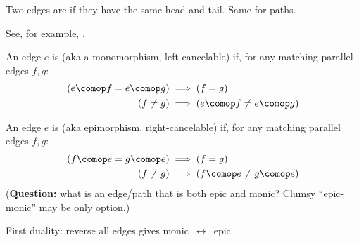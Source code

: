 \documentclass[11pt,openany]{book}
\let\oldfigure\figure%
\let\endoldfigure\endfigure%
\renewenvironment{figure}[1][htbp]%
  {\oldfigure[#1]\mdframed[backgroundcolor=GhostWhite,linecolor=GhostWhite]}
  {\endmdframed\endoldfigure}
\begin{document}
Two edges are  
if they have the same head and tail.
Same for paths.


See, for example, \cite{Perrone:2019:CatTheory}.

\begin{figure}
\centering
{}
\caption{Monic edge $e$: 
$\left( f \neq g \right) 
\implies 
\left( e \comop f \, \neq \, e \comop g \right)$.}
\label{fig:monic}
\end{figure}

An edge $e$ is  (aka a monomorphism, left-cancelable)
if, for any matching parallel edges $f,g$:
\begin{align*}
\left( e \comop f = e \comop g \right) 
& 
\implies 
\left( f = g \right) 
\\
\left( f \neq g \right) 
&
\implies 
\left( e \comop f \neq e \comop g \right) 
\end{align*}

\begin{figure}
\centering
{}
\caption{Epic edge $e$: 
$\left( f \neq g \right)
 \implies 
 \left( f \comop e \, \neq \, g \comop e \right)$.}
\label{fig:epic}
\end{figure}

An edge $e$ is  (aka epimorphism, right-cancelable)
if, for any matching parallel edges $f,g$:
\begin{align*}
\left( f \comop e = g \comop e \right) 
& 
\implies 
\left( f = g \right)
\\
\left( f \neq g \right)
& 
\implies 
\left( f \comop e \neq g \comop e \right) 
\end{align*}
(\textbf{Question:} 
what is an edge/path that is both epic and monic?
Clumsy ``epic-monic'' may be only option.)

First duality: reverse all edges gives monic $\,\leftrightarrow\,$ epic.

\begin{figure}
\centering
{}
\caption{Split monic edge $e$, if the two edge path
$V_0 \longrightarrow V_0$
composes to the identity loop.}
\label{fig:split_monic}
\end{figure}
\end{document}
